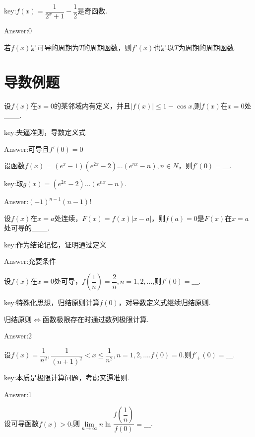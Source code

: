 \documentclass[12pt, a4paper, oneside]{ctexbook}
\begin{document}
\hspace*{\fill}

key:$f(x)=\dfrac{1}{2^x+1}-\dfrac{1}{2}$是奇函数.

Answer:0

\hspace*{\fill}

若$f(x)$是可导的周期为$T$的周期函数，则$f'(x)$也是以$T$为周期的周期函数.


\section{导数例题}

设$f(x)$在$x=0$的某邻域内有定义，并且$|f(x)|\leq 1-\cos x$,则$f(x)$在$x=0$处\_\_\_.

key:夹逼准则，导数定义式

Answer:可导且$f'(0)=0$

\hspace*{\fill}

设函数$f(x)=(e^x-1)(e^{2x}-2)...(e^{nx}-n),n \in N$，则$f'(0)=\_\_\_$.

key:取$g(x)=(e^{2x}-2)...(e^{nx}-n)$.

Answer:$(-1)^{n-1}(n-1)!$

\hspace*{\fill}


设$f(x)$在$x=a$处连续，$F(x)=f(x)|x-a|$，则$f(a)=0$是$F(x)$在$x=a$处可导的\_\_\_.

key:作为结论记忆，证明通过定义

Answer:充要条件

\hspace*{\fill}

设$f(x)$在$x=0$处可导，$f(\dfrac{1}{n})=\dfrac{2}{n},n=1,2,...$,则$f'(0)=\_\_\_$.

key:特殊化思想，归结原则计算$f(0)$，对导数定义式继续归结原则.

归结原则$\iff$函数极限存在时通过数列极限计算.

Answer:2

\hspace*{\fill}

设$f(x)=\dfrac{1}{n^2},\dfrac{1}{(n+1)^2}< x \leq \dfrac{1}{n^2},n=1,2,...$.$f(0)=0$.则$f'_{+}(0)=\_\_\_$.

key:本质是极限计算问题，考虑夹逼准则.

Answer:1

\hspace*{\fill}

设可导函数$f(x)>0$,则$\lim\limits_{n \to \infty}n\ln \dfrac{f(\dfrac{1}{n})}{f(0)}=\_\_\_$.
\end{document}
